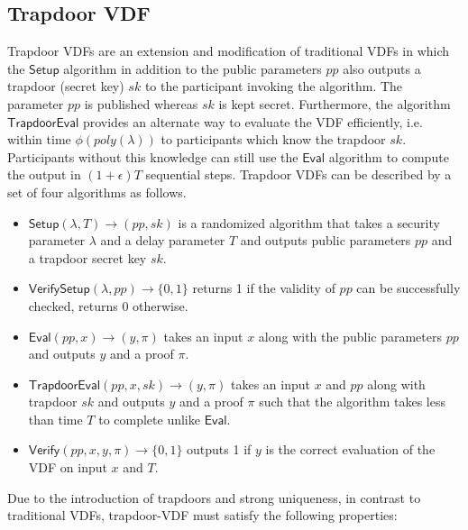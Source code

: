 \documentclass[letterpaper,twocolumn,10pt]{article}
\theoremstyle{definition}
\theoremstyle{remark}
\begin{document}
\subsection{Trapdoor VDF}
\label{appendix:tvdf}
Trapdoor VDFs \cite{wesolowski2019efficient, schindler2021randrunner} are an extension and modification of traditional VDFs in which the $\mathsf{Setup}$ algorithm in addition to the public parameters $pp$ also outputs a trapdoor (secret key) $sk$ to the participant invoking the algorithm. The parameter $pp$ is published whereas $sk$ is kept secret. Furthermore, the algorithm $\mathsf{TrapdoorEval}$ provides an alternate way to evaluate the VDF efficiently, i.e. within time $\phi{(poly{(\lambda)})}$ to participants which know the trapdoor $sk$. Participants without this knowledge can still use the $\mathsf{Eval}$ algorithm to compute the output in $(1+\epsilon)T$ sequential steps.
Trapdoor VDFs can be described by a set of four algorithms as follows.
\begin{itemize}
    \item $\mathsf{Setup}(\lambda, T) \rightarrow (pp, sk)$ is a randomized algorithm that takes a security parameter $\lambda$ and a delay parameter $T$ and outputs public parameters $pp$ and a trapdoor secret key $sk$.
    \item $\mathsf{VerifySetup}(\lambda, pp) \rightarrow \{0, 1\}$ returns 1 if the validity of $pp$ can be successfully checked, returns 0 otherwise.
    \item $\mathsf{Eval}(pp, x) \rightarrow (y, \pi)$ takes an input $x$ along with the public parameters $pp$ and outputs $y$ and a proof $\pi$.
    \item $\mathsf{TrapdoorEval}(pp, x, sk) \rightarrow (y, \pi)$ takes an input $x$ and $pp$ along with trapdoor $sk$ and outputs $y$ and a proof $\pi$ such that the algorithm takes less than time $T$ to complete unlike $\mathsf{Eval}$.
    \item $\mathsf{Verify}(pp, x, y, \pi) \rightarrow \{0, 1\}$ outputs 1 if $y$ is the correct evaluation of the VDF on input $x$ and $T$.
\end{itemize}

Due to the introduction of trapdoors and strong uniqueness, in contrast to traditional VDFs, trapdoor-VDF must satisfy the following properties:
\end{document}
